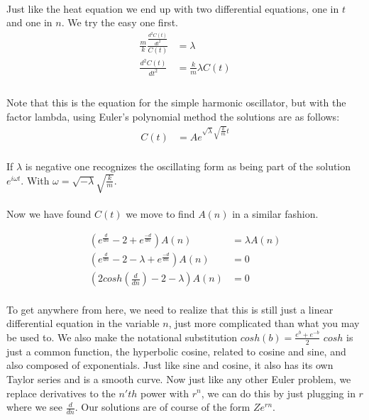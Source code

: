 \documentclass{article}
\begin{document}
	\paragraph{}
	Just like the heat equation we end up with two differential equations, one in $t$ and one in $n$. We try the easy one first.
	\begin{align}
		\frac{m}{k}\frac{\frac{d^{2}C(t)}{dt^{2}}}{C(t)} &= \lambda\\
		\frac{d^{2}C(t)}{dt^{2}} &= \frac{k}{m}\lambda C(t)\\
	\end{align}
	\paragraph{}
	Note that this is the equation for the simple harmonic oscillator, but with the factor lambda, using Euler's polynomial method the solutions are as follows:
	\begin{align}
		C(t) &= Ae^{\sqrt{\lambda} \sqrt{\frac{k}{m}}t}
	\end{align}
	\paragraph{}
	If $\lambda$ is negative one recognizes the oscillating form as being part of the solution $e^{i \omega t}$. With $\omega = \sqrt{-\lambda} \sqrt{\frac{k}{m}}$.
	
	\paragraph{}
	Now we have found $C(t)$ we move to find $A(n)$ in a similar fashion.
	
	\begin{align}
		 (e^{\frac{d}{dn}} - 2 + e^{\frac{-d}{dn}})A(n)  &= \lambda A(n)\\
		 (e^{\frac{d}{dn}} - 2 - \lambda + e^{\frac{-d}{dn}})A(n)  &= 0\\
		 (2cosh(\frac{d}{dn}) - 2 - \lambda)A(n)  &= 0
	\end{align}
	\paragraph{}
	To get anywhere from here, we need to realize that this is still just a linear differential equation in the variable $n$, just more complicated than what you may be used to. We also make the notational substitution $cosh(b) = \frac{e^{b} + e^{-b}}{2}$ $cosh$ is just a common function, the hyperbolic cosine, related to cosine and sine, and also composed of exponentials. Just like sine and cosine, it also has its own Taylor series and is a smooth curve. Now just like any other Euler problem, we replace derivatives to the $n'th$ power with $r^{n}$, we can do this by just plugging in $r$ where we see $\frac{d}{dn}$. Our solutions are of course of the form $Ze^{rn}$.
\end{document}
